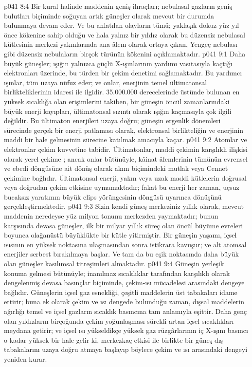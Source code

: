 \vs p041 8:4 Bir kural halinde maddenin geniş ihraçları; nebulasal gazların geniş bulutları biçiminde soğuyan artık güneşler olarak mevcut bir durumda bulunmaya devam eder. Ve bu anlatılan olayların tümü; yaklaşık dokuz yüz yıl önce kökenine sahip olduğu ve hala yalnız bir yıldız olarak bu düzensiz nebulasal kütlesinin merkezi yakınlarında ana âlem olarak ortaya çıkan, Yengeç nebulası gibi düzensiz nebulaların birçok türünün kökenini açıklamaktadır.
\vs p041 9:1 Daha büyük güneşler; ışığın yalnızca güçlü X\hyp{}ışınlarının yardımı vasıtasıyla kaçtığı elektronları üzerinde, bu türden bir çekim denetimi sağlamaktadır. Bu yardımcı ışınlar, tüm uzaya nüfuz eder; ve onlar, enerjinin temel ültimatonsal birlikteliklerinin idaresi ile ilgidir. 35.000.000 derecelerinde üstünde bulunan en yüksek sıcaklığa olan erişimlerini takiben, bir güneşin öncül zamanlarındaki büyük enerji kayıpları, ültimatonsal sızıntı olarak ışığın kaçmasıyla çok ilgili değildir. Bu ültimaton enerjileri uzaya doğru; güneşin ergenlik dönemleri sürecinde gerçek bir enerji patlaması olarak, elektronsal birlikteliğin ve enerjinin maddi bir hale gelmesinin sürecine katılmak amacıyla kaçar.
\vs p041 9:2 Atomlar ve elektronlar çekim kuvvetine tabidir. Ültimatonlar, maddi çekimin karşılıklı ilişkisi olarak yerel çekime ; ancak onlar bütünüyle, kâinat âlemlerinin tümünün evrensel ve ebedi döngüsüne ait dönüş olarak akım biçimindeki mutlak veya Cennet çekimine bağlıdır. Ültimatonsal enerji, yakın veya uzak maddi kütlelerin doğrusal veya doğrudan çekim etkisine uymamaktadır; fakat bu enerji her zaman, uçsuz bucaksız yaratımın büyük elips yörüngesinin döngüsü uyarınca dönüşünü gerçekleştirmektedir.
\vs p041 9:3 Sizin kendi güneş merkeziniz yıllık olarak, mevcut maddenin neredeyse yüz milyon tonunu merkezden yaymaktadır; bunun karşısında devasa güneşler, ilk bir milyar yıllık süreç olan öncül büyüme evreleri boyunca olağanüstü büyüklükte bir kütle yitirmiştir. Bir güneşin yaşamı, içsel ısısının en yüksek noktasına ulaşmasından sonra istikrara kavuşur; ve alt atomsal enerjiler serbest bırakılmaya başlar. Ve tam da bu eşik noktasında daha büyük olan güneşler kasılımsal titreşimleri almaktadır.
\vs p041 9:4 Güneşin yerleşik konuma gelmesi bütünüyle; inanılmaz sıcaklıklar tarafından karşılıklı olarak dengelenmiş devasa basınçlar biçiminde, çekim\hyp{}ısı mücadelesi arasındaki dengeye bağlıdır. Güneşlerin içsel gaz esnekliği, çeşitli maddelerin üst tabakaları idame ettirir; buna ek olarak çekim ve ısı dengede bulunduğu zaman, dışsal maddelerin ağırlığı temel ve içsel gazların sıcaklık basıncına tam anlamıyla eşittir. Daha genç olan yıldızların birçoğunda çekim yoğunlaşması sürekli artan içsel sıcaklıkları meydana getirir; ve içsel ısı yükseldikçe yüksek gaz rüzgârlarının iç X\hyp{}ışını basıncı o kadar yüksek bir hale gelir ki, merkezkaç etkisi ile birlikte bir güneş dış tabakalarını uzaya doğru atmaya başlayıp böylece çekim ve ısı arasındaki dengeyi yeniden kurar.
